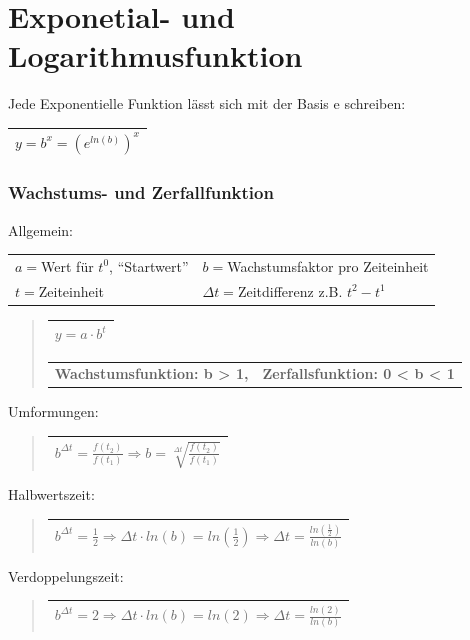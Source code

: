 \part*{Exponetial- und Logarithmusfunktion}

Jede Exponentielle Funktion lässt sich mit der Basis e schreiben:

\begin{tabular}{|c|}
\hline 
$y=b^{x}=(e^{ln(b)})^{x}$\tabularnewline
\hline 
\end{tabular}


\section*{Wachstums- und Zerfallfunktion}

Allgemein:

\begin{tabular}{ll}
$a=$Wert für $t^{0}$, ``Startwert'' & $b=$Wachstumsfaktor pro Zeiteinheit\tabularnewline
$t=$Zeiteinheit & $\Delta t=$Zeitdifferenz z.B. $t^{2}-t^{1}$\tabularnewline
\end{tabular}
\begin{verse}
\begin{tabular}{|c|}
\hline 
$y=a\cdot b^{t}$\tabularnewline
\hline 
\end{tabular}

\begin{tabular}{cc}
\textbf{Wachstumsfunktion: b > 1,} & \textbf{Zerfallsfunktion: 0 < b < 1 }\tabularnewline
\end{tabular}
\end{verse}
Umformungen:
\begin{verse}
\begin{tabular}{|c|}
\hline 
$b^{\Delta t}=\frac{f(t_{2})}{f(t_{1})}\Rightarrow b=\sqrt[\Delta t]{\frac{f(t_{2})}{f(t_{1})}}$\tabularnewline
\hline 
\end{tabular}
\end{verse}
Halbwertszeit:
\begin{verse}
\begin{tabular}{|c|}
\hline 
$b^{\Delta t}=\frac{1}{2}\Rightarrow\Delta t\cdot ln(b)=ln(\frac{1}{2})\Rightarrow\Delta t=\frac{ln(\frac{1}{2})}{ln(b)}$\tabularnewline
\hline 
\end{tabular}
\end{verse}
Verdoppelungszeit:
\begin{verse}
\begin{tabular}{|c|}
\hline 
$b^{\Delta t}=2\Rightarrow\Delta t\cdot ln(b)=ln(2)\Rightarrow\Delta t=\frac{ln(2)}{ln(b)}$\tabularnewline
\hline 
\end{tabular}
\end{verse}

